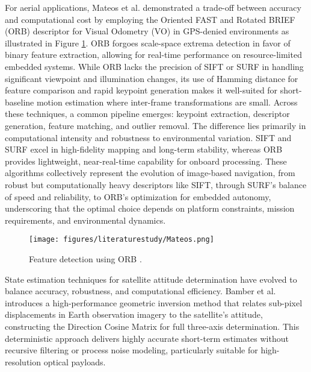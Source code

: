 \noindent
For aerial applications, Mateos et al. \cite{Mateos2024} demonstrated a trade-off between accuracy and computational cost by employing the Oriented FAST and Rotated BRIEF (ORB) descriptor for Visual Odometry (VO) in GPS-denied environments as illustrated in Figure \ref{fig:Mateos}. ORB forgoes scale-space extrema detection in favor of binary feature extraction, allowing for real-time performance on resource-limited embedded systems. While ORB lacks the precision of SIFT or SURF in handling significant viewpoint and illumination changes, its use of Hamming distance for feature comparison and rapid keypoint generation makes it well-suited for short-baseline motion estimation where inter-frame transformations are small. Across these techniques, a common pipeline emerges: keypoint extraction, descriptor generation, feature matching, and outlier removal. The difference lies primarily in computational intensity and robustness to environmental variation. SIFT and SURF excel in high-fidelity mapping and long-term stability, whereas ORB provides lightweight, near-real-time capability for onboard processing. These algorithms collectively represent the evolution of image-based navigation, from robust but computationally heavy descriptors like SIFT, through SURF's balance of speed and reliability, to ORB's optimization for embedded autonomy, underscoring that the optimal choice depends on platform constraints, mission requirements, and environmental dynamics.

\begin{figure}[H]
    \centering
    \texttt{[image: figures/literaturestudy/Mateos.png]}
    \caption{Feature detection using ORB \cite{Mateos2024}.}
    \label{fig:Mateos}
\end{figure}


\noindent
State estimation techniques for satellite attitude determination have evolved to balance accuracy, robustness, and computational efficiency. Bamber et al. \cite{Bamber} introduces a high-performance geometric inversion method that relates sub-pixel displacements in Earth observation imagery to the satellite's attitude, constructing the Direction Cosine Matrix for full three-axis determination. This deterministic approach delivers highly accurate short-term estimates without recursive filtering or process noise modeling, particularly suitable for high-resolution optical payloads.
\vspace{0.5cm}

